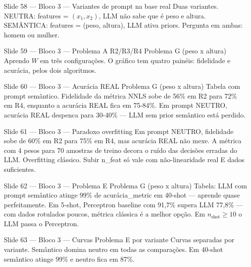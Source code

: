 \documentclass[aspectratio=169,10pt]{beamer}
\begin{document}
\begin{frame}{Slide 58 --- Bloco 3 --- Variantes de prompt na base real}
\footnotesize
Duas variantes. NEUTRA: features = $(x_1, x_2)$, LLM n\~ao sabe que \'e peso e altura. SEM\^ANTICA: features = (peso, altura), LLM ativa priors. Pergunta em ambas: homem ou mulher.
\end{frame}

\begin{frame}{Slide 59 --- Bloco 3 --- Problema A R2/R3/R4 Problema G (peso x altura)}
\footnotesize
Aprendo $W$ em tr\^es configura\c{c}\~oes. O gr\'afico tem quatro pain\'eis: fidelidade e acur\'acia, pelos dois algoritmos.
\end{frame}

\begin{frame}{Slide 60 --- Bloco 3 --- Acur\'acia REAL Problema G (peso x altura)}
\footnotesize
Tabela com prompt sem\^antico. Fidelidade da m\'etrica NNLS sobe de 56\% em R2 para 72\% em R4, enquanto a acur\'acia REAL fica em 75-84\%. Em prompt NEUTRO, acur\'acia REAL despenca para 30-40\% --- LLM sem prior sem\^antico est\'a perdido.
\end{frame}

\begin{frame}{Slide 61 --- Bloco 3 --- Paradoxo overfitting}
\footnotesize
Em prompt NEUTRO, fidelidade sobe de 60\% em R2 para 75\% em R4, mas acur\'acia REAL n\~ao mexe. A m\'etrica com 4 pesos para 70 amostras de treino decora o ru\'ido das decis\~oes erradas do LLM. Overfitting cl\'assico. Subir n\_feat s\'o vale com n\~ao-linearidade real E dados suficientes.
\end{frame}

\begin{frame}{Slide 62 --- Bloco 3 --- Problema E Problema G (peso x altura)}
\footnotesize
Tabela: LLM com prompt sem\^antico atinge 99\% de acur\'acia\_metric em 40-shot --- aprende quase perfeitamente. Em 5-shot, Perceptron baseline com 91,7\% supera LLM 77,8\% --- com dados rotulados poucos, m\'etrica cl\'assica \'e a melhor op\c{c}\~ao. Em $n_{\text{shot}} \geq 10$ o LLM passa o Perceptron.
\end{frame}

\begin{frame}{Slide 63 --- Bloco 3 --- Curvas Problema E por variante}
\footnotesize
Curvas separadas por variante. Sem\^antico domina neutro em todas as compara\c{c}\~oes. Em 40-shot sem\^antico atinge 99\% e neutro fica em 87\%.
\end{frame}
\end{document}
